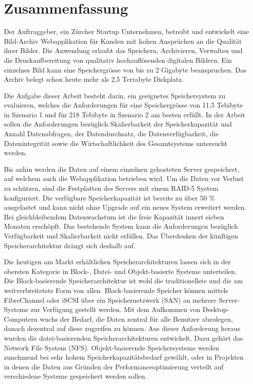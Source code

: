 \cleardoublepage
\chapter{Zusammenfassung}

Der Auftraggeber, ein Zürcher Startup Unternehmen, betreibt und entwickelt eine Bild-Archiv Webapplikation für Kunden mit hohen Ansprüchen an die Qualität ihrer Bilder. Die Anwendung erlaubt das Speichern, Archivieren, Verwalten und die Druckaufbereitung von qualitativ hochauflösenden digitalen Bildern. Ein einzelnes Bild kann eine Speichergrösse von bis zu 2 Gigabyte beanspruchen. Das Archiv belegt schon heute mehr als 2,5 Terrabyte Diskplatz.

Die Aufgabe dieser Arbeit besteht darin, ein geeignetes Speichersystem zu evaluieren, welches die Anforderungen für eine Speichergrösse von 11,5 Tebibyte in Szenario 1 und für 218 Tebibyte in Szenario 2 am besten erfüllt. In der Arbeit sollen die Anforderungen bezüglich Skalierbarkeit der Speicherkapazität und Anzahl Datenabfragen, der Datendurchsatz, die Datenverfügbarkeit, die Datenintegrität sowie die Wirtschaftlichkeit des Gesamtsystems untersucht werden.

Bis anhin werden die Daten auf einem einzelnen gehosteten Server gespeichert, auf welchem auch die Webapplikation betrieben wird. Um die Daten vor Verlust zu schützen, sind die Festplatten des Servers mit einem RAID-5 System konfiguriert. Die verfügbare Speicherkapazität ist bereits zu über 50 \% ausgelastet und kann nicht ohne Upgrade auf ein neues System erweitert werden. Bei gleichbleibendem Datenwachstum ist die freie Kapazität innert sieben Monaten erschöpft. Das bestehende System kann die Anforderungen bezüglich Verfügbarkeit und Skalierbarkeit nicht erfüllen. Das Überdenken der künftigen Speicherarchitektur drängt sich deshalb auf. 

Die heutigen am Markt erhältlichen Speicherarchitekturen lassen sich in der obersten Kategorie in Block-, Datei- und Objekt-basierte Systeme unterteilen. Die Block-basierende Speicherarchitektur ist wohl die traditionellste und die am weitverbreitetste Form von allen. Block-basierende Speicher können mittels FibreChannel oder iSCSI über ein Speichernetzwerk (SAN) an mehrere Server-Systeme zur Verfügung gestellt werden. Mit dem Aufkommen von Desktop-Computern wuchs der Bedarf, die Daten zentral für alle Benutzer abzulegen, danach dezentral auf diese zugreifen zu können. Aus dieser Anforderung heraus wurden die datei-basierenden Speicherarchitekturen entwickelt. Dazu gehört das Network File System (NFS). Objekt-basierende Speichersysteme werden zunehmend bei sehr hohem Speicherkapazitätsbedarf gewählt, oder in Projekten in denen die Daten aus Gründen der Performanceoptimierung verteilt auf verschiedene Systeme gespeichert werden sollen.

